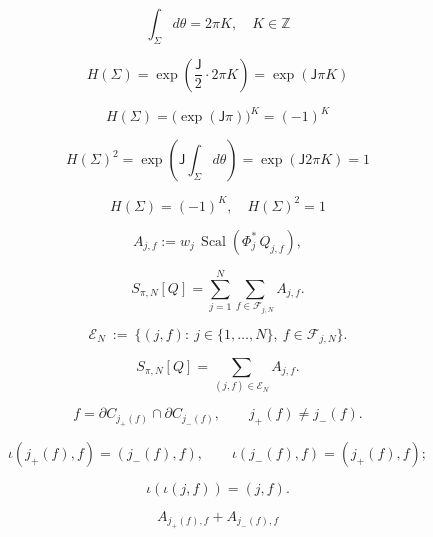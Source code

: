 \documentclass[12pt]{article}
\begin{document}
\begin{equation}
\int_\Sigma d\theta=2\pi K,\quad K\in\mathbb{Z}
\end{equation}

\begin{equation}
H(\Sigma)
=\exp\!\left(\frac{\mathsf{J}}{2}\cdot 2\pi K\right)
=\exp(\mathsf{J}\pi K)
\end{equation}

\begin{equation}
H(\Sigma)
=\bigl(\exp(\mathsf{J}\pi)\bigr)^K
=(-1)^K
\end{equation}

\begin{equation}
H(\Sigma)^2
=\exp\!\left(\mathsf{J}\int_\Sigma d\theta\right)
=\exp(\mathsf{J}2\pi K)
=1
\end{equation}

\begin{equation}
\boxed{H(\Sigma)=(-1)^K,\quad H(\Sigma)^2=1}
\end{equation}

\begin{equation}
A_{j,f}:=w_j\,\operatorname{Scal}\!\left(\Phi_j^*\,Q_{j,f}\right),
\end{equation}

\begin{equation}
S_{\pi,N}[Q]=\sum_{j=1}^N\sum_{f\in\mathcal{F}_{j,N}}A_{j,f}.
\end{equation}

\begin{equation}
\mathcal{E}_N\ :=\ \{(j,f):\ j\in\{1,\dots,N\},\ f\in\mathcal{F}_{j,N}\}.
\end{equation}

\begin{equation}
S_{\pi,N}[Q]=\sum_{(j,f)\in\mathcal{E}_N}A_{j,f}.
\end{equation}

\begin{equation}
f=\partial C_{j_+(f)}\cap\partial C_{j_-(f)},\qquad j_+(f)\neq j_-(f).
\end{equation}

\begin{equation}
\iota(j_+(f),f)=(j_-(f),f),\qquad \iota(j_-(f),f)=(j_+(f),f);
\end{equation}

\begin{equation}
\iota(\iota(j,f))=(j,f).
\end{equation}

\begin{equation}
A_{j_+(f),f}+A_{j_-(f),f}
\end{equation}
\end{document}
